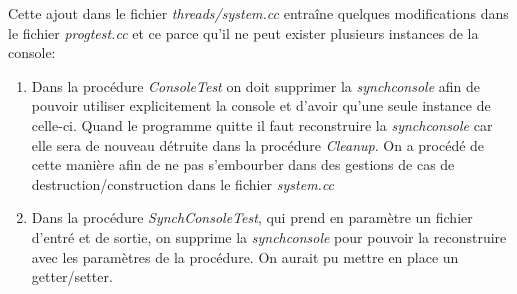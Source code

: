 \documentclass[a4paper,10pt]{report}
\begin{document}
  Cette ajout dans le fichier \emph{threads/system.cc} entraîne quelques modifications dans le fichier \emph{progtest.cc} et ce parce qu'il ne peut exister
  plusieurs instances de la console:
    \begin{enumerate}
     \item Dans la procédure \emph{ConsoleTest} on doit supprimer la \emph{synchconsole} afin de pouvoir utiliser explicitement la console et d'avoir qu'une
     seule instance de celle-ci. Quand le programme quitte il faut reconstruire la \emph{synchconsole} car elle sera de nouveau détruite dans la procédure 
     \emph{Cleanup}. On a procédé de cette manière afin de ne pas s'embourber dans des gestions de cas de destruction/construction dans le fichier \emph{system.cc}
     \item Dans la procédure \emph{SynchConsoleTest}, qui prend en paramètre un fichier d'entré et de sortie, on supprime la \emph{synchconsole} pour pouvoir
     la reconstruire avec les paramètres de la procédure. On aurait pu mettre en place un getter/setter.
    \end{enumerate}
\end{document}
